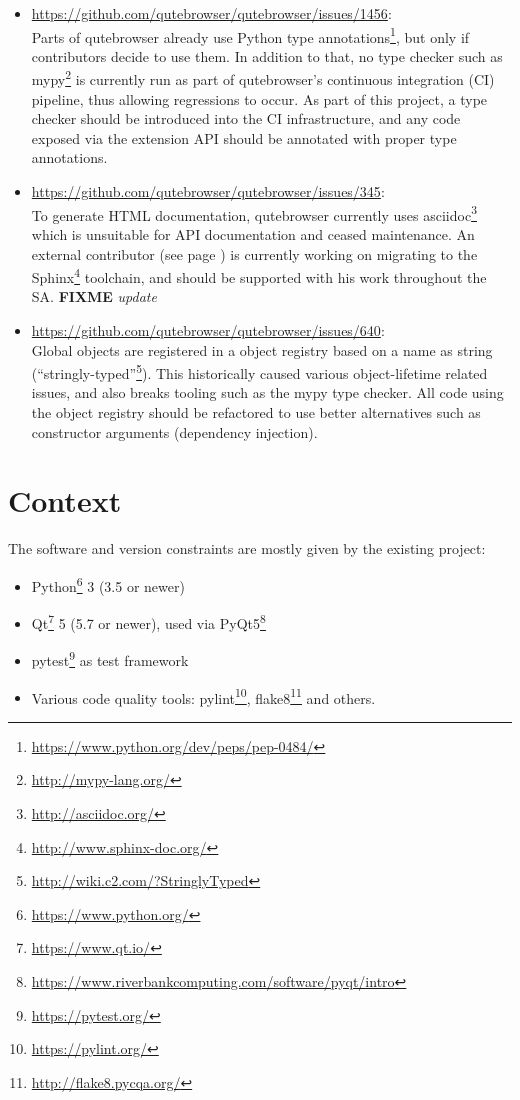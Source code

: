 \documentclass[a4paper,parskip=full]{scrreprt}
\newcommand{\fixme}[1]{\textbf{FIXME} \emph{#1}}
\begin{document}
\begin{itemize}
  \item \url{https://github.com/qutebrowser/qutebrowser/issues/1456}: \\ Parts of qutebrowser already use Python type
    annotations\footnote{\url{https://www.python.org/dev/peps/pep-0484/}}, but
    only if contributors decide to use them. In addition to that, no type
    checker such as mypy\footnote{\url{http://mypy-lang.org/}} is currently run
    as part of qutebrowser's continuous integration (CI) pipeline, thus allowing
    regressions to occur. As part of this project, a type checker should be
    introduced into the CI infrastructure, and any code exposed via the extension
    API should be annotated with proper type annotations.
  \item \url{https://github.com/qutebrowser/qutebrowser/issues/345}: \\
    To generate HTML documentation, qutebrowser currently uses
    asciidoc\footnote{\url{http://asciidoc.org/}} which is unsuitable for API
    documentation and ceased maintenance. An external contributor (see page
    \pageref{fiete}) is currently working on migrating to the
    Sphinx\footnote{\url{http://www.sphinx-doc.org/}} toolchain, and should be
    supported with his work throughout the SA. \fixme{update}
  \item \url{https://github.com/qutebrowser/qutebrowser/issues/640}: \\
    Global objects are registered in a object registry based on a name as
    string (``stringly-typed''\footnote{\url{http://wiki.c2.com/?StringlyTyped}}).
    This historically caused various object-lifetime related issues, and also
breaks tooling such as the mypy type checker. All code using the object registry
should be refactored to use better alternatives such as constructor arguments
(dependency injection).
\end{itemize}

\section{Context}
\label{context}

The software and version constraints are mostly given by the existing project:

\begin{itemize}
  \item Python\footnote{\url{https://www.python.org/}} 3 (3.5 or newer)
  \item Qt\footnote{\url{https://www.qt.io/}} 5 (5.7 or newer), used via PyQt5\footnote{\url{https://www.riverbankcomputing.com/software/pyqt/intro}}
  \item pytest\footnote{\url{https://pytest.org/}} as test framework
  \item Various code quality tools: pylint\footnote{\url{https://pylint.org/}},
    flake8\footnote{\url{http://flake8.pycqa.org/}} and others.
\end{itemize}
\end{document}

